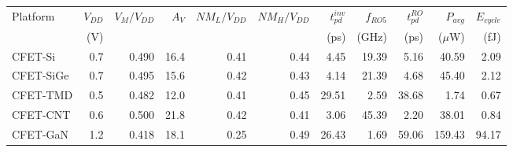 \begin{tabular}{lrrrrrrrrrr}
\hline
Platform & $V_{DD}$ & $V_M/V_{DD}$ & $A_V$ & $NM_L/V_{DD}$ & $NM_H/V_{DD}$ & $t_{pd}^{inv}$ & $f_{RO5}$ & $t_{pd}^{RO}$ & $P_{avg}$ & $E_{cycle}$ \\
 & (V) & & & & & (ps) & (GHz) & (ps) & ($\mu$W) & (fJ) \\
\hline
CFET-Si & 0.7 & 0.490 & 16.4 & 0.41 & 0.44 & 4.45 & 19.39 & 5.16 & 40.59 & 2.09 \\
CFET-SiGe & 0.7 & 0.495 & 15.6 & 0.42 & 0.43 & 4.14 & 21.39 & 4.68 & 45.40 & 2.12 \\
CFET-TMD & 0.5 & 0.482 & 12.0 & 0.41 & 0.45 & 29.51 & 2.59 & 38.68 & 1.74 & 0.67 \\
CFET-CNT & 0.6 & 0.500 & 21.8 & 0.42 & 0.41 & 3.06 & 45.39 & 2.20 & 38.01 & 0.84 \\
CFET-GaN & 1.2 & 0.418 & 18.1 & 0.25 & 0.49 & 26.43 & 1.69 & 59.06 & 159.43 & 94.17 \\
\hline
\end{tabular}
